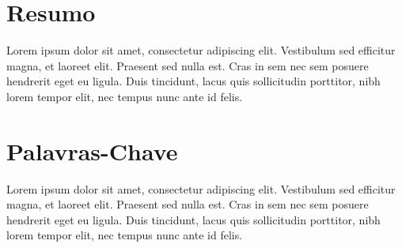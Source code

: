 \thispagestyle{plain}

\section*{Resumo}
\label{sec:resumo}

Lorem ipsum dolor sit amet, consectetur adipiscing elit. Vestibulum sed efficitur magna, et laoreet elit. Praesent sed nulla est. Cras in sem nec sem posuere hendrerit eget eu ligula. Duis tincidunt, lacus quis sollicitudin porttitor, nibh lorem tempor elit, nec tempus nunc ante id felis.

\section*{Palavras-Chave}
\label{sec:palavras}

Lorem ipsum dolor sit amet, consectetur adipiscing elit. Vestibulum sed efficitur magna, et laoreet elit. Praesent sed nulla est. Cras in sem nec sem posuere hendrerit eget eu ligula. Duis tincidunt, lacus quis sollicitudin porttitor, nibh lorem tempor elit, nec tempus nunc ante id felis.
